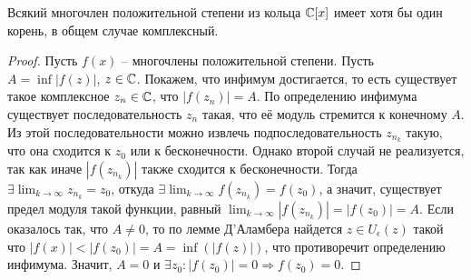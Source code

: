\begin{theorem}
    \label{ota}
    Всякий многочлен положительной степени из кольца $\mathbb{C}[x]$ имеет хотя бы один корень, в общем случае комплексный.
\end{theorem}

\begin{proof}
    Пусть $f(x)$ -- многочлены положительной степени. Пусть $A = \inf|f(z)|$, $z \in \mathbb{C}$. Покажем, что инфимум достигается, то есть существует такое комплексное $z_n \in \mathbb{C}$, что $|f(z_n)| = A$. По определению инфимума существует последовательность ${z_n}$ такая, что её модуль стремится к конечному $A$. Из этой последовательности можно извлечь
    подпоследовательность ${z_{n_k}}$ такую, что она сходится к $z_0$ или к бесконечности. Однако второй случай не реализуется, так как иначе $|f(z_{n_k})|$ также сходится к бесконечности. Тогда $\exists \lim_{k\to \infty} {z_{n_k}} = z_0$, откуда $\exists \lim_{k\to \infty} {f(z_{n_k})} = f(z_0)$, а значит, существует предел модуля такой функции, равный $\lim_{k\to \infty} {|f(z_{n_k})|} = |f(z_0)| = A$. Если оказалось так, что $A \neq 0$, то по лемме Д'Аламбера найдется $z \in U_{\epsilon}(z)$ такой что $|f(x)| < |f(z_0)| = A = \inf(|f(z)|)$, что противоречит определению инфимума. Значит, $A = 0$ и $\exists z_{0}: |f(z_{0})| = 0 \Rightarrow f(z_{0}) = 0$.
\end{proof}